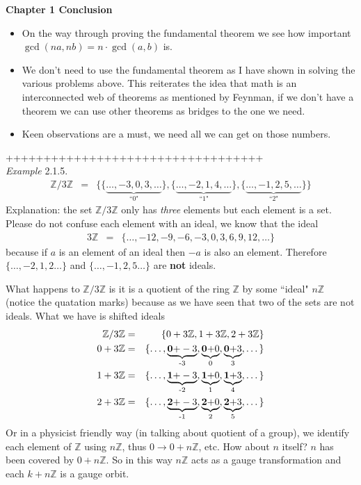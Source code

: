 \documentclass[aps,preprint,preprintnumbers,nofootinbib,showpacs,prd]{revtex4-1}
\newcommand{\bit}{\begin{itemize}}
\newcommand{\eit}{\end{itemize}}
\newcommand{\nbea}{\begin{eqnarray*}}
\newcommand{\neea}{\end{eqnarray*}}
\begin{document}
{\bf Chapter 1 Conclusion}
%
\bit
\item On the way through proving the fundamental theorem we see how important $\gcd(na,nb) = n \cdot \gcd(a,b)$ is.
\item We don't need to use the fundamental theorem as I have shown in solving the various problems above. This reiterates the idea that math is an interconnected web of theorems as mentioned by Feynman, if we don't have a theorem we can use other theorems as bridges to the one we need.
\item Keen observations are a must, we need all we can get on those numbers.
\eit
%

++++++++++++++++++++++++++++++++++\\

{\it Example }2.1.5.
%
\nbea
\mathbb{Z}/3\mathbb{Z} & = & \{ \{\underbrace{\dots, -3,0,3, \dots}_\text{``0"}\}, \{\underbrace{\dots, -2,1,4, \dots}_\text{``1"}\}, \{\underbrace{\dots, -1,2,5, \dots}_\text{``2"}\} \}
\neea
%
Explanation: the set $\mathbb{Z}/3\mathbb{Z}$ only has {\it three} elements but each element is a set. Please do not confuse each element with an ideal, we know that the ideal
%
\nbea
3\mathbb{Z} & = & \{\dots, -12,-9,-6,-3,0,3,6,9,12, \dots\}
\neea
%
because if $a$ is an element of an ideal then $-a$ is also an element. Therefore $\{\dots, -2,1,2 \dots\}$ and $\{\dots, -1,2,5 \dots\}$ are {\bf not} ideals.

What happens to $\mathbb{Z}/3\mathbb{Z}$ is it is a quotient of the ring $\mathbb{Z}$ by some ``ideal" $n\mathbb{Z}$ (notice the quatation marks) because as we have seen that two of the sets are not ideals. What we have is shifted ideals
%
\nbea
\mathbb{Z}/3\mathbb{Z} & = & \{ 0 + 3\mathbb{Z}, 1 + 3\mathbb{Z}, 2 + 3\mathbb{Z}\} \\
0 + 3\mathbb{Z} & = & \{\dots, \underbrace{{\bf 0+}-3}_\text{-3},\underbrace{{\bf 0+}0}_\text{0}, \underbrace{{\bf 0+}3}_\text{3}, \dots\} \\
1 + 3\mathbb{Z} & = & \{\dots, \underbrace{{\bf 1+}-3}_\text{-2},\underbrace{{\bf 1+}0}_\text{1},\underbrace{{\bf 1+}3}_\text{4}, \dots\} \\
2 + 3\mathbb{Z} & = & \{\dots, \underbrace{{\bf 2+}-3}_\text{-1},\underbrace{{\bf 2+}0}_\text{2},\underbrace{{\bf 2+}3}_\text{5}, \dots\}
\neea
%
Or in a physicist friendly way (in talking about quotient of a group), we identify each element of $\mathbb{Z}$ using $n\mathbb{Z}$, thus $0 \to 0 + n\mathbb{Z}$, etc. How about $n$ itself? $n$ has been covered by $0 + n\mathbb{Z}$. So in this way $n\mathbb{Z}$ acts as a gauge transformation and each $k + n\mathbb{Z}$ is a gauge orbit.
\end{document}
